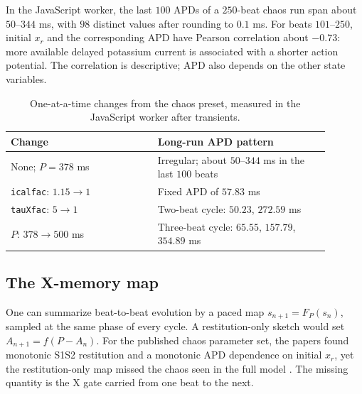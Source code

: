 \documentclass[11pt]{article}
\begin{document}
In the JavaScript worker, the last $100$ APDs of a $250$-beat chaos run span about $50$--$344$ ms, with $98$ distinct values after rounding to $0.1$ ms. For beats $101$--$250$, initial $x_r$ and the corresponding APD have Pearson correlation about $-0.73$: more available delayed potassium current is associated with a shorter action potential. The correlation is descriptive; APD also depends on the other state variables.

\begin{table}[H]
\centering
\caption{One-at-a-time changes from the chaos preset, measured in the JavaScript worker after transients.}
\begin{tabular}{p{0.41\linewidth}p{0.48\linewidth}}
\toprule
Change & Long-run APD pattern \\
\midrule
None; $P=378$ ms & Irregular; about $50$--$344$ ms in the last $100$ beats \\
\texttt{icalfac}: $1.15\to1$ & Fixed APD of $57.83$ ms \\
\texttt{tauXfac}: $5\to1$ & Two-beat cycle: $50.23$, $272.59$ ms \\
$P$: $378\to500$ ms & Three-beat cycle: $65.55$, $157.79$, $354.89$ ms \\
\bottomrule
\end{tabular}
\end{table}

\subsection{The X-memory map}

One can summarize beat-to-beat evolution by a paced map $s_{n+1}=F_P(s_n)$, sampled at the same phase of every cycle. A restitution-only sketch would set $A_{n+1}=f(P-A_n)$. For the published chaos parameter set, the papers found monotonic S1S2 restitution and a monotonic APD dependence on initial $x_r$, yet the restitution-only map missed the chaos seen in the full model \cite{landaw2017,landaw2018}. The missing quantity is the X gate carried from one beat to the next.
\end{document}
